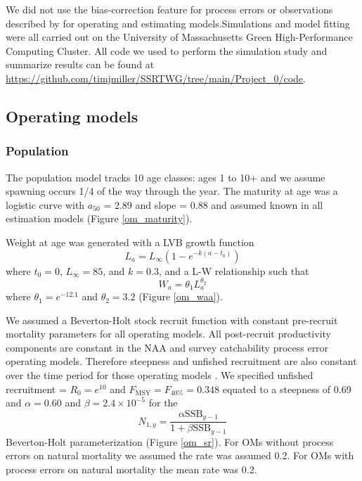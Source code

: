 \documentclass[
  12pt,
]{article}
\newcommand{\Fmsy}{\ensuremath{F_{\text{MSY}}}\xspace}
\begin{document}
We did not use the bias-correction feature for process errors or
observations described by \citet{stockmiller21} for operating and
estimating models.Simulations and model fitting were all carried out on
the University of Massachusetts Green High-Performance Computing
Cluster. All code we used to perform the simulation study and summarize
results can be found at
\url{https://github.com/timjmiller/SSRTWG/tree/main/Project_0/code}.

\hypertarget{operating-models}{%
\subsection*{Operating models}\label{operating-models}}

\hypertarget{population}{%
\subsubsection*{Population}\label{population}}

The population model tracks 10 age classes: ages 1 to 10+ and we assume
spawning occurs 1/4 of the way through the year. The maturity at age was
a logistic curve with \(a_{50}\) = 2.89 and slope = 0.88 and assumed
known in all estimation models (Figure \ref{om_maturity}).

Weight at age was generated with a LVB growth function \[
L_a = L_{\infty}\left(1 - e^{-k(a - t_0)}\right)
\] where \(t_0 = 0\), \(L_\infty = 85\), and \(k = 0.3\), and a L-W
relationship such that \[
W_a = \theta_1 L_a^{\theta_2}
\] where \(\theta_1 = e^{-12.1}\) and \(\theta_2 = 3.2\) (Figure
\ref{om_waa}).

We assumed a Beverton-Holt stock recruit function with constant
pre-recruit mortality parameters for all operating models. All
post-recruit productivity components are constant in the NAA and survey
catchability process error operating models. Therefore steepness and
unfished recruitment are also constant over the time period for those
operating models \citep{millerbrooks21}. We specified unfished
recruitment = \(R_0 = e^{10}\) and \(\Fmsy = F_{40\%} = 0.348\) equated
to a steepness of 0.69 and \(\alpha=0.60\) and
\(\beta = 2.4 \times 10^{-5}\) for the \[
N_{1,y} = \frac{\alpha \text{SSB}_{y-1}}{1 + \beta \text{SSB}_{y-1}} 
\] Beverton-Holt parameterization (Figure \ref{om_sr}). For OMs without
process errors on natural mortality we assumed the rate was assumed 0.2.
For OMs with process errors on natural mortality the mean rate was 0.2.
\end{document}
